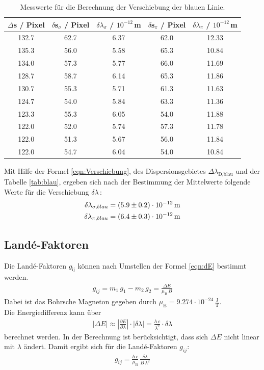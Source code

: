 \begin{table}[H]
  \centering
  \caption{Messwerte für die Berechnung der Verschiebung der blauen Linie.}
  \label{tab:blau}
  \begin{tabular}{c | c c | c c}
    $\Delta$s / Pixel & $\delta$s$_{\sigma}$ / Pixel & $\delta \lambda_{\sigma}$ / $10^{-12}$\,m & $\delta$s$_{\pi}$ / Pixel & $\delta \lambda_{\pi}$ / $10^{-12}$\,m \\
    \hline
    132.7 & 62.7 & 6.37 & 62.0 & 12.33 \\
    135.3 & 56.0 & 5.58 & 65.3 & 10.84 \\
    134.0 & 57.3 & 5.77 & 66.0 & 11.69 \\
    128.7 & 58.7 & 6.14 & 65.3 & 11.86 \\
    130.7 & 55.3 & 5.71 & 61.3 & 11.63 \\
    124.7 & 54.0 & 5.84 & 63.3 & 11.36 \\
    123.3 & 55.3 & 6.05 & 54.0 & 11.88 \\
    122.0 & 52.0 & 5.74 & 57.3 & 11.78 \\
    122.0 & 51.3 & 5.67 & 56.0 & 11.84 \\
    122.0 & 54.7 & 6.04 & 54.0 & 10.84 \\
    \hline
  \end{tabular}
\end{table}


Mit Hilfe der Formel \eqref{eqn:Verschiebung}, des Dispersionsgebietes $\Delta\lambda_\text{D,blau}$ und der Tabelle \eqref{tab:blau}, ergeben sich nach der Bestimmung der Mittelwerte folgende Werte für die Verschiebung $\delta\lambda$\,:
\begin{align*}
  \delta \lambda_{\sigma,blau} = (\num{5.9 +- 0.2})\cdot 10^{-12}\,\text{m} \\
  \delta \lambda_{\pi,blau} = (\num{6.4 +- 0.3})\cdot 10^{-12}\,\text{m}
\end{align*}



\subsection{Landé-Faktoren}
Die Landé-Faktoren $g_\text{ij}$ können nach Umstellen der Formel \eqref{eqn:dE} bestimmt werden.
\begin{align}
  g_{ij} = m_1\,g_1 - m_2\,g_2 = \frac{\Delta E}{\mu_\text{B}\,B}
\end{align}
Dabei ist das Bohrsche Magneton gegeben durch $\mu_\text{B} = 9.274 \cdot 10^{-24}\,\frac{\text{J}}{\text{T}}$.\\
Die Energiedifferenz kann über
\begin{align}
  |\Delta E| \approx \left| \frac{\partial E}{\partial \lambda}\right| \cdot |\delta\lambda| = \frac{h\,c}{\lambda^2}\cdot \delta\lambda
\end{align}
berechnet werden. In der Berechnung ist berücksichtigt, dass sich $\Delta E$ nicht linear mit $\lambda$ ändert. Damit ergibt sich für die Landé-Faktoren $g_{ij}$:
\begin{align}
  g_{ij} = \frac{h\,c}{\mu_\text{B}}\,\frac{\delta\lambda}{B\,\lambda^2}
  \label{eqn:Landé}
\end{align}



